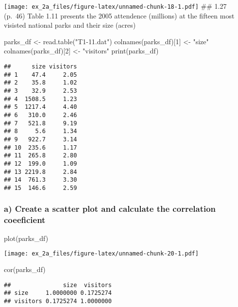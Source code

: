 \documentclass[
]{article}
\newenvironment{Shaded}{\begin{snugshade}}{\end{snugshade}}
\newcommand{\DecValTok}[1]{\textcolor[rgb]{0.00,0.00,0.81}{#1}}
\newcommand{\FunctionTok}[1]{\textcolor[rgb]{0.00,0.00,0.00}{#1}}
\newcommand{\NormalTok}[1]{#1}
\newcommand{\OtherTok}[1]{\textcolor[rgb]{0.56,0.35,0.01}{#1}}
\newcommand{\StringTok}[1]{\textcolor[rgb]{0.31,0.60,0.02}{#1}}
\begin{document}
\texttt{[image: ex\_2a\_files/figure-latex/unnamed-chunk-18-1.pdf]} \#\#
1.27 (p.~46) Table 1.11 presents the 2005 attendence (millions) at the
fifteen most visisted national parks and their size (acres)

\begin{Shaded}
\begin{Highlighting}[]
\NormalTok{parks\_df }\OtherTok{\textless{}{-}} \FunctionTok{read.table}\NormalTok{(}\StringTok{"T1{-}11.dat"}\NormalTok{)}
\FunctionTok{colnames}\NormalTok{(parks\_df)[}\DecValTok{1}\NormalTok{] }\OtherTok{\textless{}{-}} \StringTok{"size"}
\FunctionTok{colnames}\NormalTok{(parks\_df)[}\DecValTok{2}\NormalTok{] }\OtherTok{\textless{}{-}} \StringTok{"visitors"}
\FunctionTok{print}\NormalTok{(parks\_df)}
\end{Highlighting}
\end{Shaded}

\begin{verbatim}
##      size visitors
## 1    47.4     2.05
## 2    35.8     1.02
## 3    32.9     2.53
## 4  1508.5     1.23
## 5  1217.4     4.40
## 6   310.0     2.46
## 7   521.8     9.19
## 8     5.6     1.34
## 9   922.7     3.14
## 10  235.6     1.17
## 11  265.8     2.80
## 12  199.0     1.09
## 13 2219.8     2.84
## 14  761.3     3.30
## 15  146.6     2.59
\end{verbatim}

\hypertarget{a-create-a-scatter-plot-and-calculate-the-correlation-coeeficient}{%
\subsubsection{a) Create a scatter plot and calculate the correlation
coeeficient}\label{a-create-a-scatter-plot-and-calculate-the-correlation-coeeficient}}

\begin{Shaded}
\begin{Highlighting}[]
\FunctionTok{plot}\NormalTok{(parks\_df)}
\end{Highlighting}
\end{Shaded}

\texttt{[image: ex\_2a\_files/figure-latex/unnamed-chunk-20-1.pdf]}

\begin{Shaded}
\begin{Highlighting}[]
\FunctionTok{cor}\NormalTok{(parks\_df)}
\end{Highlighting}
\end{Shaded}

\begin{verbatim}
##               size  visitors
## size     1.0000000 0.1725274
## visitors 0.1725274 1.0000000
\end{verbatim}
\end{document}

